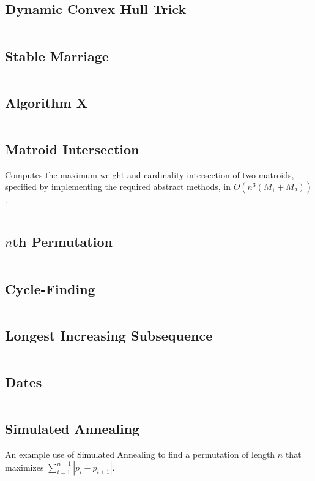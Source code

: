 \documentclass[8pt,a4paper,landscape,oneside]{amsart}
\newcommand{\code}[1]{\inputminted[fontsize=\normalsize,baselinestretch=1]{cpp}{_code/#1}}
\newif\ifverbose
\begin{document}
\begin{multicols*}{3}
  \subsection{Dynamic Convex Hull Trick}
    \code{other/dynamic-ch-trick.cpp}
  \subsection{Stable Marriage}
    \ifverbose
    The Gale-Shapley algorithm for solving the stable marriage problem.
    \fi
    \code{other/stable_marriage.cpp}
  \subsection{Algorithm X}
    \ifverbose
    An implementation of Knuth's Algorithm X, using dancing links. Solves the Exact Cover problem.
    \fi
    \code{other/algorithm_x.cpp}
  \subsection{Matroid Intersection}
    Computes the maximum weight and cardinality intersection of two
    matroids, specified by implementing the required abstract methods, in
    $O(n^3(M_1+M_2))$.
    \code{other/matroid_intersection.cpp}
  \subsection{$n$th Permutation}
    \ifverbose
    A very fast algorithm for computing the $n$th permutation of the list
    $\{0,1,\ldots,k-1\}$.
    \fi
    \code{other/nth_permutation.cpp}
  \subsection{Cycle-Finding}
    \ifverbose
    An implementation of Floyd's Cycle-Finding algorithm.
    \fi
    \code{other/floyds_algorithm.cpp}
  \subsection{Longest Increasing Subsequence}
    \code{other/lis.cpp}
  \subsection{Dates}
    \ifverbose
    Functions to simplify date calculations.
    \fi
    \code{other/dates.cpp}
  \subsection{Simulated Annealing}
    An example use of Simulated Annealing to find a permutation of length $n$
    that maximizes $\sum_{i=1}^{n-1}|p_i - p_{i+1}|$.
    \code{other/simulated_annealing.cpp}

\end{multicols*}
\end{document}
